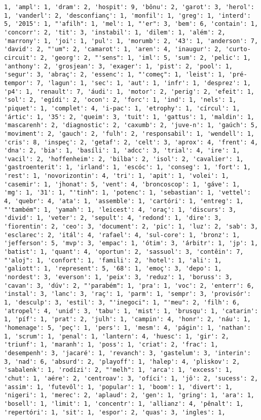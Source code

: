 \documentclass[11pt]{article}
\begin{document}
\begin{Verbatim}[commandchars=\\\{\}]
1, 'ampl': 1, 'dram': 2, 'hospit': 9, 'bônu': 2, 'garot': 3, 'herol': 1, 'vanderl': 2, 'desconfianç': 1, 'monfil': 1, 'greg': 1, 'interd': 5, '2015': 1, "'afilh": 1, 'mel': 1, "'er": 3, 'bem': 6, 'contain': 1, 'concorr': 2, 'tit': 3, 'instabil': 1, 'dilem': 1, 'além': 2, 'marrony': 1, 'joi': 1, 'pul': 1, 'morumb': 2, '43': 1, 'anderson': 7, 'david': 2, "'um": 2, 'camarot': 1, 'aren': 4, 'inaugur': 2, 'curto-circuit': 2, 'georg': 2, "'sens": 1, 'iml': 5, 'sum': 2, 'pelic': 1, 'anthony': 2, 'grosjean': 3, 'exager': 1, 'pist': 2, 'pool': 1, 'segur': 3, 'abraç': 2, 'essenc': 1, "'começ": 1, 'leist': 1, 'pré-tempor': 7, 'lagun': 1, 'sec': 1, 'aut': 1, 'infr': 1, 'desprez': 1, 'p4': 1, 'renault': 7, 'áudi': 1, 'motor': 2, 'perig': 2, 'efeit': 1, 'sol': 2, 'egídi': 2, 'ocon': 2, 'forc': 1, 'ind': 1, 'nels': 1, 'piquet': 1, 'complet': 4, 'i-pac': 1, 'etrophy': 1, 'círcul': 1, 'ártic': 1, '35': 2, 'queim': 3, 'tuit': 1, 'gattus': 1, 'maldin': 1, 'mascarenh': 2, 'diagnostic': 2, 'caxumb': 2, 'juve-n': 1, 'gaúch': 5, 'moviment': 2, 'gauch': 2, 'fulh': 2, 'responsabil': 1, 'wendell': 1, 'cris': 8, 'inspeç': 2, 'getaf': 2, 'celt': 3, 'aprox': 4, 'frent': 4, 'dna': 2, 'bia': 1, 'basíli': 1, 'adcc': 3, 'trial': 4, 'ire': 1, 'vacil': 2, 'hoffenheim': 2, 'bilba': 2, 'isol': 2, 'cavalier': 1, 'gastroenterit': 1, 'irland': 1, 'escóc': 1, 'conseg': 1, 'fort': 1, 'rest': 1, 'novorizontin': 4, 'tri': 1, 'apit': 1, 'volei': 1, 'casemir': 1, 'jhonat': 5, 'vent': 4, 'broncoscop': 1, 'gáve': 1, 'mg': 1, '31': 1, "'tinh": 1, 'potenc': 1, 'sebastian': 1, 'vettel': 4, 'quebr': 4, 'ata': 1, 'assemble': 1, 'cartóri': 1, 'entreg': 1, "'também": 1, 'yamah': 1, 'leicest': 4, 'oraç': 1, 'discurs': 3, 'divid': 1, 'veter': 2, 'sepult': 4, 'redond': 1, 'dire': 3, 'fiorentin': 2, 'ceo': 3, 'document': 2, 'pic': 1, 'luz': 2, 'sab': 3, 'esclarec': 2, 'itál': 4, 'rafael': 4, 'sul-core': 1, 'bronz': 1, 'jefferson': 5, 'mvp': 3, 'empac': 1, 'ótim': 3, 'árbitr': 1, 'jp': 1, 'batist': 1, 'quant': 4, 'oportun': 2, 'sassuol': 3, 'contêin': 7, "'aloj": 1, 'confort': 1, 'famili': 2, 'hotel': 1, 'ali': 1, 'galiott': 1, 'represent': 5, '68': 1, 'emoç': 3, 'depo': 1, 'nordest': 3, 'everson': 1, 'peix': 3, 'reduz': 1, 'boruss': 3, 'cavan': 3, 'dúv': 2, "'parabém": 1, 'pra': 1, 'voc': 2, 'enterr': 6, 'instal': 3, 'lanc': 3, 'raç': 1, 'parm': 1, 'sempr': 3, 'provisór': 1, 'desculp': 3, 'estil': 3, "'inegoci": 1, "'meu": 2, 'filh': 6, 'atropel': 4, 'unid': 3, 'tabu': 1, 'mist': 1, 'brusqu': 1, 'catarin': 1, 'píf': 1, 'prat': 2, 'julh': 1, 'campin': 4, 'honr': 2, 'náu': 1, 'homenage': 5, 'peç': 1, 'pers': 1, 'mesm': 4, 'págin': 1, 'nathan': 1, 'scrum': 1, 'penal': 1, 'lantern': 4, 'huesc': 1, 'gir': 2, 'triunf': 1, 'maranh': 1, 'poss': 1, 'criat': 2, 'frac': 1, 'desempenh': 3, 'jacaré': 1, 'revanch': 3, 'gastelum': 3, 'interin': 3, 'nad': 6, 'absurd': 2, 'playoff': 1, 'halep': 4, 'pliskov': 2, 'sabalenk': 1, 'rodízi': 2, "'melh": 1, 'arca': 1, 'excess': 1, 'chut': 1, 'aére': 2, 'centroav': 3, 'ofíci': 1, 'jô': 2, 'sucess': 2, 'assim': 1, 'futevôl': 1, 'popular': 1, 'boom': 1, 'divert': 1, 'nigeri': 1, 'merec': 2, 'aplaud': 2, 'gen': 1, 'gring': 1, 'ara': 1, 'bosell': 1, 'limit': 1, 'concentr': 1, 'allianz': 4, 'pênalt': 1, 'repertóri': 1, 'sit': 1, 'espor': 2, 'quas': 3, 'ingles': 1, 
\end{Verbatim}
\end{document}
